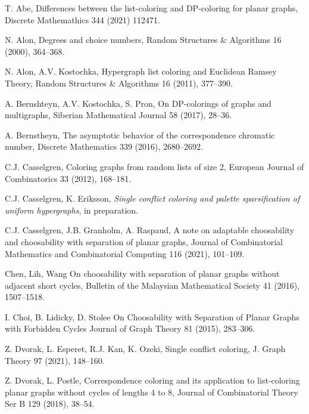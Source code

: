 \documentclass[12pt]{article}
\begin{document}
\begin{thebibliography}{}

T. Abe,
Differences between the list-coloring and DP-coloring for
planar graphs,
Discrete Mathemathics 344 (2021) 112471.

N. Alon, Degrees and choice numbers,
Random Structures \& Algorithms 16 (2000), 364--368.

N. Alon, A.V. Kostochka,
Hypergraph list coloring and Euclidean Ramsey Theory,
Random Structures \& Algorithms 16 (2011), 377--390.



A. Bernshteyn, A.V. Kostochka, S. Pron,
On DP-colorings of graphs and multigraphs,
Siberian Mathematical Journal 58 (2017), 28--36.

A. Bernstheyn, 
The asymptotic behavior of the correspondence chromatic
number,
Discrete Mathematics 339 (2016), 2680--2692.

C.J. Casselgren,
Coloring graphs
from random lists of size 2, 
European Journal of Combinatorics 33 (2012), 168--181.

C.J. Casselgren, K. Eriksson,
{\em Single conflict coloring and palette sparsification of uniform hypergraphs},
in preparation.

C.J. Casselgren, J.B. Granholm, A. Raspaud,
A note on adaptable choosability and choosability with separation of planar graphs,
 Journal of Combinatorial Mathematics and Combinatorial Computing 116 (2021), 101--109.

Chen, Lih, Wang
On choosability with separation of planar graphs without adjacent short cycles,
Bulletin of the Malaysian Mathematical Society 41 (2016), 1507--1518.


I. Choi, B. Lidicky, D. Stolee
On Choosability with Separation of Planar Graphs with Forbidden Cycles
Journal of Graph Theory 81 (2015), 283--306.


Z. Dvorak, L. Esperet, R.J. Kan, K. Ozeki,
Single conflict coloring,
J. Graph Theory 97 (2021), 148--160.

Z. Dvorak, L. Postle,
Correspondence coloring and its application to list-coloring planar graphs without cycles of lengths 4 to 8,
Journal of Combinatorial Theory Ser B 129 (2018), 38--54.


\end{thebibliography}
\end{document}
